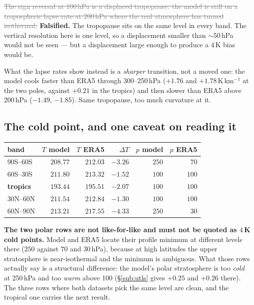 \documentclass[10pt]{article}
\newcommand{\dead}[1]{\textcolor{gray}{\sout{#1}}}
\begin{document}
\dead{The sign reversal at 100\,hPa is a displaced tropopause: the model is still on a
tropospheric lapse rate at 200\,hPa where the real atmosphere has turned isothermal.}
\textbf{Falsified.} The tropopause sits on the same level in every band. The vertical
resolution here is one level, so a displacement smaller than ${\sim}50$\,hPa would not be
seen --- but a displacement large enough to produce a $4$\,K bias would be.

What the lapse rates show instead is a \emph{sharper} transition, not a moved one: the model
cools faster than ERA5 through 300--250\,hPa ($+1.76$ and $+1.78$\,K\,km$^{-1}$ at the two
poles, against $+0.21$ in the tropics) and then slower than ERA5 above 200\,hPa
($-1.49$, $-1.85$). Same tropopause, too much curvature at it.

\subsection{The cold point, and one caveat on reading it}\label{sub:r25coldpoint}
\begin{center}\footnotesize
\begin{tabular}{l r r r r r}
\toprule
band & $T$ model & $T$ ERA5 & $\Delta T$ & $p$ model & $p$ ERA5 \\
\midrule
90S--60S & $208.77$ & $212.03$ & $-3.26$ & $250$ & $70$ \\
60S--30S & $211.80$ & $213.32$ & $-1.52$ & $100$ & $100$ \\
\textbf{tropics} & $\mathbf{193.44}$ & $\mathbf{195.51}$ & $\mathbf{-2.07}$ & $100$ & $100$ \\
30N--60N & $211.54$ & $212.84$ & $-1.30$ & $100$ & $100$ \\
60N--90N & $213.21$ & $217.55$ & $-4.33$ & $250$ & $30$ \\
\bottomrule
\end{tabular}
\end{center}

\noindent \textbf{The two polar rows are not like-for-like and must not be quoted as
$4$\,K cold points.} Model and ERA5 locate their profile minimum at different levels there
($250$ against $70$ and $30$\,hPa), because at high latitudes the upper stratosphere is
near-isothermal and the minimum is ambiguous. What those rows actually say is a structural
difference: the model's polar stratosphere is too \emph{cold} at 250\,hPa and too
\emph{warm} above 100 (\S\ref{sub:utls} gives $+0.25$ and $+0.26$ there). The three rows
where both datasets pick the same level are clean, and the tropical one carries the next
result.
\end{document}
